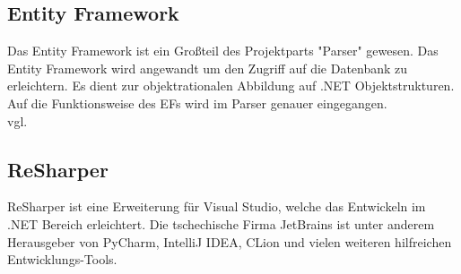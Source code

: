 \subsection {Entity Framework}
\label{sec:ef}
Das Entity Framework ist ein Großteil des Projektparts "Parser" gewesen. Das Entity Framework wird angewandt um den Zugriff auf die Datenbank zu erleichtern. Es dient zur objektrationalen Abbildung auf .NET Objektstrukturen. Auf die Funktionsweise des EFs wird im Parser genauer eingegangen. \\vgl. \cite{entityframework}
\subsection {ReSharper}
\label{sec:ReSharper}
ReSharper ist eine Erweiterung für Visual Studio, welche das Entwickeln im .NET Bereich erleichtert. Die tschechische Firma JetBrains ist unter anderem Herausgeber von PyCharm, IntelliJ IDEA,  CLion und vielen weiteren hilfreichen Entwicklungs-Tools. 
